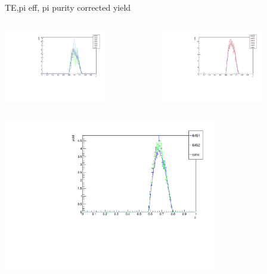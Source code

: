 \begin{frame}{TE,pi eff, pi purity corrected yield}
\begin{columns}
\begin{column}[T]{0.5\textwidth}
\includegraphics[width = 0.7\textwidth]{results/yield/check/yieldcheck_280_neg.pdf}
\end{column}
\begin{column}[T]{0.5\textwidth}
\includegraphics[width = 0.7\textwidth]{results/yield/check/yieldcheck_280_pos.pdf}
\end{column}
\end{columns}
\begin{columns}
\begin{column}[T]{0.5\textwidth}
\includegraphics[width = 0.7\textwidth]{results/yield/check/yieldcheck_270_neg.pdf}

\end{column}
\end{columns}
\end{frame}
